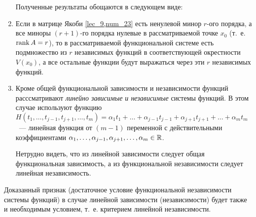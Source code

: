 \documentclass[../main.tex]{subfiles}
\begin{document}
\begin{remarks}

	\begin{enumerate}
		Полученные результаты обощаются в следующем виде:
		
		\item
		Если в матрице Якоби \eqref{lec_9,num_23} есть ненулевой 
		минор $r$-ого порядка, а все миноры $(r+1)$-го 
		порядка нулевые 
		в рассматриваемой точке $x_0$ (т.~е. $\operatorname{rank} A = r$), то в 
		рассматриваемой функциональной системе есть подмножество 
		из $r$ независимых функций в соответствующей окрестности 
		$V(x_0)$, а все остальные функции будут выражаться через 
		эти $r$ независимых функций.
		
		\item
		Кроме общей функциональной зависимости и независимости 
		функций расссматривают \emph{линейно зависимые и независимые} 
		системы функций. В этом случае используют функцию 
		$H( t_1, \ldots, t_{j-1}, t_{j+1}, \ldots, t_m 
		) = \alpha_1 t_1 + \ldots + \alpha_{j-1} t_{j-1} + 
		\alpha_{j+1} t_{j+1} + \ldots + \alpha_m t_m$~--- 
		линейная функция от $(m-1)$ переменной с действительными 
		коэффициентами $\alpha_1, \ldots, \alpha_{j-1}, 
		\alpha_{j+1}, \ldots, \alpha_m \in \mathbb{R}$.
	
		Нетрудно видеть, что из линейной зависимости следует 
		общая функциональная зависимость, а из функциональной 
		независимости следует линейная независимость.
	\end{enumerate}
\end{remarks}
\begin{remark}
	\;
	
	Доказанный признак (достаточное условие функциональной 
	независимости системы функций) 
	в случае линейной зависимости (независимости) будет также и 
	необходимым условием, т.~е. критерием линейной независимости.
\end{remark}
\end{document}
